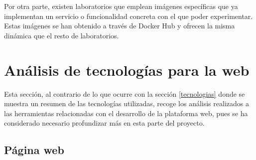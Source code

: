                 Por otra parte, existen laboratorios que emplean imágenes específicas que ya implementan un servicio o funcionalidad concreta con el que poder experimentar. Estas imágenes se han obtenido a través de Docker Hub y ofrecen la misma dinámica que el resto de laboratorios.

                \newpage

    
    \section{Análisis de tecnologías para la web}
        \label{sec:analisis-tecnologias}

        Esta sección, al contrario de lo que ocurre con la sección \ref{tecnologias} donde se muestra un resumen de las tecnologías utilizadas, recoge los análisis realizados a las herramientas relacionadas con el desarrollo de la plataforma web, pues se ha considerado necesario profundizar más en esta parte del proyecto.

        \subsection{Página web}

